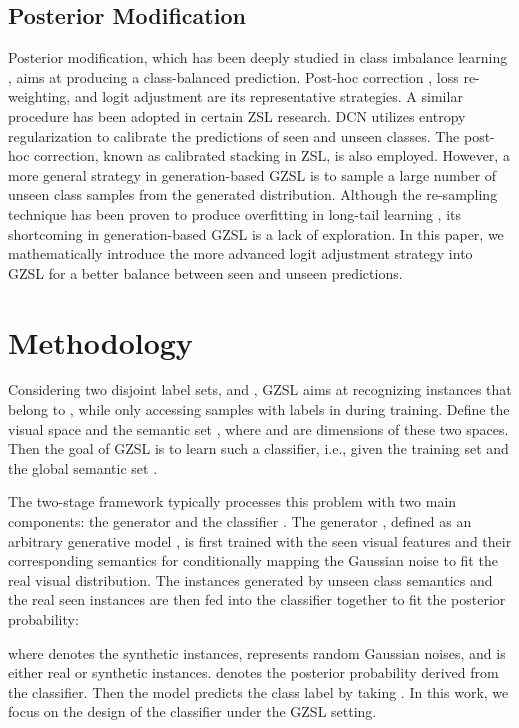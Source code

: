 \documentclass{article}
\begin{document}
\subsection{Posterior Modification}
Posterior modification, which has been deeply studied in class imbalance learning \cite{lin2017focal,menon2020long}, aims at producing a class-balanced prediction. Post-hoc correction \cite{collell2016reviving}, loss re-weighting\cite{menon2013statistical}, and logit adjustment \cite{menon2020long} are its representative strategies. A similar procedure has been adopted in certain ZSL research. DCN \cite{liu2018generalized} utilizes entropy regularization to calibrate the predictions of seen and unseen classes. The post-hoc correction, known as calibrated stacking \cite{chao2016empirical} in ZSL, is also employed. However, a more general strategy in generation-based GZSL is to sample a large number of unseen class samples from the generated distribution. Although the re-sampling technique \cite{chawla2002smote} has been proven to produce overfitting in long-tail learning \cite{collell2016reviving}, its shortcoming in generation-based GZSL is a lack of exploration. In this paper, we mathematically introduce the more advanced logit adjustment strategy into GZSL for a better balance between seen and unseen predictions.

	\section{Methodology}
	
	Considering two disjoint label sets,  and , GZSL aims at recognizing instances that belong to , while only accessing samples with labels in  during training. Define the visual space  and the semantic set , where  and  are dimensions of these two spaces. Then the goal of GZSL is to learn such a classifier, i.e.,  given the training set  and the global semantic set .
	
	The two-stage framework typically processes this problem with two main components: the generator  and the classifier . The generator , defined as an arbitrary generative model \cite{kingma2013auto,goodfellow2014generative}, is first trained with the seen visual features and their corresponding semantics for conditionally mapping the Gaussian noise to fit the real visual distribution. The instances generated by unseen class semantics and the real seen instances are then fed into the classifier  together to fit the posterior probability:
	
	where  denotes the synthetic instances,  represents random Gaussian noises, and  is either real or synthetic instances.  denotes the posterior probability derived from the classifier. Then the model predicts the class label by taking . In this work, we focus on the design of the classifier under the GZSL setting.
	
\end{document}
